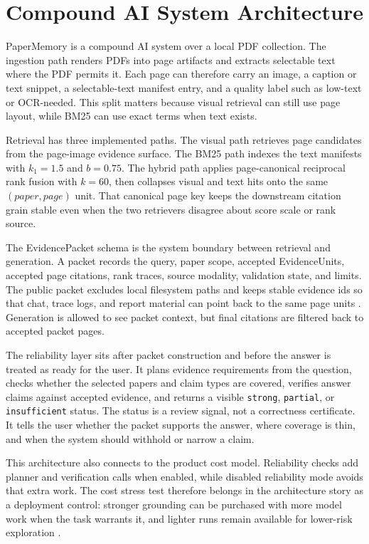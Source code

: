\section{Compound AI System Architecture}

PaperMemory is a compound AI system over a local PDF collection. The ingestion path renders PDFs into page artifacts and extracts selectable text where the PDF permits it. Each page can therefore carry an image, a caption or text snippet, a selectable-text manifest entry, and a quality label such as low-text or OCR-needed. This split matters because visual retrieval can still use page layout, while BM25 can use exact terms when text exists.



Retrieval has three implemented paths. The visual path retrieves page candidates from the page-image evidence surface. The BM25 path indexes the text manifests with $k_1=1.5$ and $b=0.75$. The hybrid path applies page-canonical reciprocal rank fusion with $k=60$, then collapses visual and text hits onto the same $(paper, page)$ unit. That canonical page key keeps the downstream citation grain stable even when the two retrievers disagree about score scale or rank source.

The EvidencePacket schema is the system boundary between retrieval and generation. A packet records the query, paper scope, accepted EvidenceUnits, accepted page citations, rank traces, source modality, validation state, and limits. The public packet excludes local filesystem paths and keeps stable evidence ids so that chat, trace logs, and report material can point back to the same page units \citep{paperMemoryEvidenceContract,paperMemoryChatPacket}. Generation is allowed to see packet context, but final citations are filtered back to accepted packet pages.

The reliability layer sits after packet construction and before the answer is treated as ready for the user. It plans evidence requirements from the question, checks whether the selected papers and claim types are covered, verifies answer claims against accepted evidence, and returns a visible \texttt{strong}, \texttt{partial}, or \texttt{insufficient} status. The status is a review signal, not a correctness certificate. It tells the user whether the packet supports the answer, where coverage is thin, and when the system should withhold or narrow a claim.

This architecture also connects to the product cost model. Reliability checks add planner and verification calls when enabled, while disabled reliability mode avoids that extra work. The cost stress test therefore belongs in the architecture story as a deployment control: stronger grounding can be purchased with more model work when the task warrants it, and lighter runs remain available for lower-risk exploration \citep{paperMemoryCostBenefit}.

